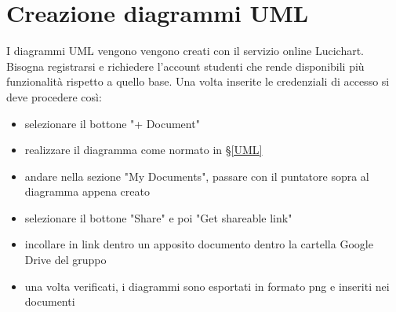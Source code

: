 \section{Creazione diagrammi UML}
I diagrammi UML vengono vengono creati con il servizio online Lucichart. Bisogna registrarsi e richiedere l'account studenti che rende disponibili più funzionalità rispetto a quello base. Una volta inserite le credenziali di accesso si deve procedere così:
\begin{itemize}
	\item selezionare il bottone "+ Document"
	\item realizzare il diagramma come normato in §\ref{UML}
	\item andare nella sezione "My Documents", passare con il puntatore sopra al diagramma appena creato
	\item selezionare il bottone "Share" e poi "Get shareable link"
	\item incollare in link dentro un apposito documento dentro la cartella Google Drive del gruppo
	\item una volta verificati, i diagrammi sono esportati in formato png e inseriti nei documenti
\end{itemize}